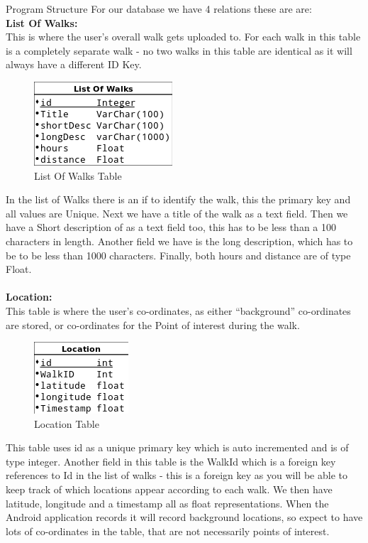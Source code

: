 \documentclass[12pt]{article}
\makeatletter
\renewcommand{\paragraph}{
  \@startsection{paragraph}{4}
  {\z@}{3.25ex \@plus -10em \@minus 1em}{0.1em}
  {\normalfont\normalsize\bfseries}
}
\makeatother
\begin{document}
\paragraph{Program Structure}	
For our database we have 4 relations these are are: 
	\\
	\indent\textbf{List Of Walks:}~\\
	This is where the user's overall walk gets uploaded to. For each walk in this table is a completely separate walk - no two walks in this table are identical as it will always have a different ID Key.
		\begin{figure}[htp]
\centering
\includegraphics[scale=0.60]{Final_report/List_of_Walks.png}
\caption{List Of Walks Table}
\label{List Of Walks Table}
\end{figure}
In the list of Walks there is an if to identify the walk, this the primary key and all values are Unique. Next we have a title of the walk as a text field. Then we have a Short description of as a text field too, this has to be less than a 100 characters in length. Another field we have is the long description, which has to be to be less than 1000 characters. Finally, both hours and distance are of type Float. ~\\
~\\
	\indent\textbf{Location:}~\\\clearpage
	This table is where the user's co-ordinates, as either ``background'' co-ordinates are stored, or co-ordinates for the Point of interest during the walk. 
	\begin{figure}[htp]
\centering
\includegraphics[scale=0.70]{Final_report/Location.png}
\caption{Location Table}
\label{Location Table}
\end{figure}
This table uses id as a unique primary key which is auto incremented and is of type integer. Another field in this table is the WalkId which is a foreign key references to Id in the list of walks - this is a foreign key as you will be able to keep track of which locations appear according to each walk. We then have latitude, longitude and a timestamp all as float representations. When the Android application records it will record background locations, so expect to have lots of co-ordinates in the table, that are not necessarily points of interest.
\end{document}
